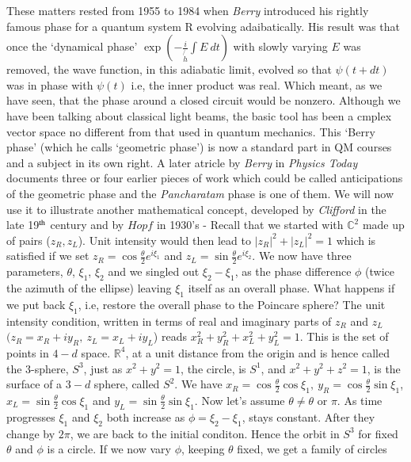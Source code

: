 These matters rested from 1955 to 1984 when \textit{Berry} introduced his rightly
famous phase for a quantum system R evolving adaibatically. His result was that
once the `dynamical phase' $\exp(-  \frac{i}{\not{h}} \int E ~dt)$  with slowly varying $E$ was removed,
the wave function, in this adiabatic limit, evolved so that $\psi(t + dt)$ was in phase
with $\psi(t)$ i.e, the inner product was real. Which meant, as we have seen, that
the phase around a closed circuit would be nonzero. Although we have been
talking about classical light beams, the basic tool has been a cmplex vector
space no different from that used in quantum mechanics. This `Berry phase'
(which he calls `geometric phase') is now a standard part in QM courses and a
subject in its own right. A later atricle by \textit{Berry} in \textit{Physics Today} documents
three or four earlier pieces of work which could be called anticipations of the
geometric phase and the \textit{Pancharatam} phase is one of them. We will now use
it to illustrate another mathematical concept, developed by \textit{Clifford} in the late
19$^{\rm th}$ century and by $Hopf$ in 1930's - Recall that we started with $\mathbb{C}^2$ made up
of pairs ($z_R, z_L$). Unit intensity would then lead to $| z_R |^2 + | z_L |^2 = 1$ which
is satisfied if we set $z_R = \cos \frac{\theta}{2} e^{i \xi_1}$ and $z_L = \sin \frac{\theta}{2} e^{i \xi_2}$. We now have three
parameters, $\theta$, $\xi_1$, $\xi_2$ and we singled out $\xi_2 - \xi_1$, as the phase difference $\phi$ (twice
the azimuth of the ellipse) leaving $\xi_1$ itself as an overall phase. What happens if
we put back $\xi_1$, i.e, restore the overall phase to the Poincare sphere? The unit
intensity condition, written in terms of real and imaginary parts of $z_R$ and $z_L$
$(z_R = x_R + iy_R, ~z_L = x_L + iy_L$) reads $x^2_R + y^2_R + x^2_L + y^2_L = 1$. This is the set of
points in $4-d$ space. $\mathbb{R}^4$, at a unit distance from the origin and is hence called the
3-sphere, $S^3$, just as $x^2 + y^2 = 1$, the circle, is $S^1$, and $x^2 + y^2 + z^2 = 1$, is the
surface of a $3-d$ sphere, called $S^2$. We have $x_R = \cos \frac{\theta}{2} \cos \xi_1, ~y_R = \cos \frac{\theta}{2} \sin \xi_1$, 
$x_L = \sin \frac{\theta}{2} \cos \xi_1$ and $y_L = \sin \frac{\theta}{2} \sin \xi_1$. Now let's assume $\theta \neq \theta$ or $\pi$. As time
progresses $\xi_1$ and $\xi_2$ both increase as $\phi = \xi_2 - \xi_1$, stays constant. After they
change by $2\pi$, we are back to the initial conditon. Hence the orbit in $S^3$ for fixed
$\theta$ and $\phi$ is a circle. If we now vary $\phi$, keeping $\theta$ fixed, we get a family of circles
